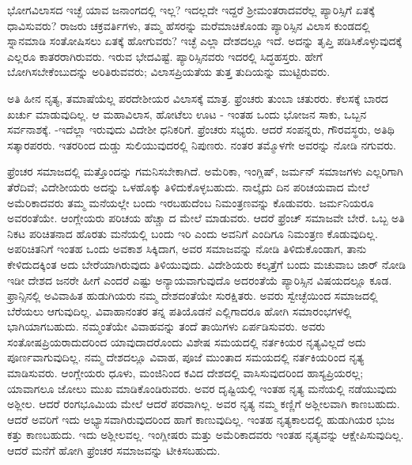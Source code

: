 ಭೋಗವಿಲಾಸದ ಇಚ್ಛೆ ಯಾವ ಜನಾಂಗದಲ್ಲಿ ಇಲ್ಲ? ಇದಲ್ಲದೇ ಇದ್ದರೆ ಶ‍್ರೀಮಂತ\break ರಾದವರೆಲ್ಲ ಪ್ಯಾರಿಸ್ಸಿಗೆ ಏತಕ್ಕೆ ಧಾವಿಸುವರು? ರಾಜರು ಚಕ್ರವರ್ತಿಗಳು, ತಮ್ಮ ಹೆಸರನ್ನು ಮರೆಮಾಚಿಕೊಂಡು ಪ್ಯಾರಿಸ್ಸಿನ ವಿಲಾಸ ಕುಂಡದಲ್ಲಿ ಸ್ನಾನಮಾಡಿ ಸಂತೋಷಿಸಲು ಏತಕ್ಕೆ ಹೋಗುವರು? ಇಚ್ಛೆ ಎಲ್ಲಾ ದೇಶದಲ್ಲೂ ಇದೆ. ಅದನ್ನು ತೃಪ್ತಿ ಪಡಿಸಿಕೊಳ್ಳುವುದಕ್ಕೆ ಎಲ್ಲರೂ ಕಾತರರಾಗಿರುವರು. ಇರುವ ಭೇದವಿಷ್ಟೆ. ಪ್ಯಾರಿಸ್ಸಿನವರು ಇದರಲ್ಲಿ ಸಿದ್ಧಹಸ್ತರು. ಹೇಗೆ ಬೋಗಿಸಬೇಕೆಂಬುದನ್ನು ಅರಿತಿರುವವರು; ವಿಲಾಸಪ್ರಿಯತೆಯ ತುತ್ತ ತುದಿಯನ್ನು ಮುಟ್ಟಿರುವರು.

ಅತಿ ಹೀನ ನೃತ್ಯ, ತಮಾಷೆಯೆಲ್ಲ ಪರದೇಶೀಯರ ವಿಲಾಸಕ್ಕೆ ಮಾತ್ರ. ಫ್ರೆಂಚರು ತುಂಬಾ ಚತುರರು. ಕೆಲಸಕ್ಕೆ ಬಾರದ ಖರ್ಚು ಮಾಡುವುದಿಲ್ಲ. ಆ ಮಹಾವಿಲಾಸ, ಹೋಟೆಲು ಊಟ - ಇಂತಹ ಒಂದು ಭೋಜನ ಸಾಕು, ಒಬ್ಬನ ಸರ್ವನಾಶಕ್ಕೆ. -ಇದೆಲ್ಲಾ ಇರುವುದು ವಿದೇಶೀ ಧನಿಕರಿಗೆ. ಫ್ರೆಂಚರು ಸಭ್ಯರು. ಆದರೆ ಸಂಪನ್ನರು, ಗೌರವಸ್ಥರು, ಅತಿಥಿ ಸತ್ಕಾರಪರರು. ಇತರರಿಂದ ದುಡ್ಡು ಸುಲಿಯುವುದರಲ್ಲಿ ನಿಪುಣರು. ನಂತರ ತಮ್ಮೊಳಗೇ ಅವರನ್ನು ನೋಡಿ ನಗುವರು.

\vskip 5pt

ಫ್ರೆಂಚರ ಸಮಾಜದಲ್ಲಿ ಮತ್ತೊಂದನ್ನು ಗಮನಿಸಬೇಕಾಗಿದೆ. ಅಮೆರಿಕಾ, ಇಂಗ್ಲಿಷ್​, ಜರ್ಮನ್​ ಸಮಾಜಗಳು ಎಲ್ಲರಿಗಾಗಿ ತೆರೆದಿವೆ; ವಿದೇಶೀಯರು ಅದನ್ನು ಒಳಹೊಕ್ಕು ತಿಳಿದುಕೊಳ್ಳಬಹುದು. ನಾಲ್ಕೈದು ದಿನ ಪರಿಚಯವಾದ ಮೇಲೆ ಅಮೆರಿಕಾದವರು ತಮ್ಮ ಮನೆಯಲ್ಲೇ ಬಂದು ಇರಬಹುದೆಂಬ ನಿಮಂತ್ರಣವನ್ನು ಕೊಡುವರು. ಜರ್ಮನಿಯರೂ ಅವರಂತೆಯೇ. ಆಂಗ್ಲೇಯರು ಪರಿಚಯ ಹೆಚ್ಚಾ ದ ಮೇಲೆ ಮಾಡುವರು. ಆದರೆ ಫ್ರೆಂಚ್​ ಸಮಾಜವೇ ಬೇರೆ. ಒಬ್ಬ ಅತಿ ನಿಕಟ ಪರಿಚಿತನಾದ ಹೊರತು ಮನೆಯಲ್ಲಿ ಬಂದು ಇರಿ ಎಂದು ಅವನಿಗೆ ಎಂದಿಗೂ ನಿಮಂತ್ರಣ ಕೊಡುವುದಿಲ್ಲ. ಅಪರಿಚಿತನಿಗೆ ಇಂತಹ ಒಂದು ಅವಕಾಶ ಸಿಕ್ಕಿದಾಗ, ಅವರ ಸಮಾಜವನ್ನು ನೋಡಿ ತಿಳಿದುಕೊಂಡಾಗ, ತಾನು ಕೇಳಿದುದಕ್ಕಿಂತ ಅದು ಬೇರೆಯಾಗಿರುವುದು ತಿಳಿಯುವುದು. ವಿದೇಶಿಯರು ಕಲ್ಕತ್ತೆಗೆ ಬಂದು ಮಚುವಾಬ ಜಾರ್​ ನೋಡಿ ಇಡೀ ದೇಶದ ಜನರೇ ಹೀಗೆ ಎಂದರೆ ಎಷ್ಟು ಅನ್ಯಾಯವಾಗುವುದೊ ಅದರಂತೆಯೆ ಪ್ಯಾರಿಸ್ಸಿನ ವಿಷಯದಲ್ಲೂ ಕೂಡ. ಫ್ರಾನ್ಸಿನಲ್ಲಿ ಅವಿವಾಹಿತ ಹುಡುಗಿಯರು ನಮ್ಮ ದೇಶದಂತೆಯೇ ಸುರಕ್ಷಿತರು. ಅವರು ಸ್ವೇಚ್ಛೆಯಿಂದ ಸಮಾಜದಲ್ಲಿ ಬೆರೆಯಲು ಆಗುವುದಿಲ್ಲ. ವಿವಾಹಾನಂತರ ತನ್ನ ಪತಿಯೊಡನೆ ಎಲ್ಲಿಗಾದರೂ ಹೋಗಿ ಸಮಾರಂಭಗಳಲ್ಲಿ ಭಾಗಿಯಾಗಬಹುದು. ನಮ್ಮಂತೆಯೇ ವಿವಾಹವನ್ನು ತಂದೆ ತಾಯಿಗಳು ಏರ್ಪಡಿಸುವರು. ಅವರು ಸಂತೋಷಪ್ರಿಯರಾದುದರಿಂದ ಯಾವುದಾದರೊಂದು ವಿಶೇಷ ಸಮಯದಲ್ಲಿ ನರ್ತಕಿಯರ ನೃತ್ಯವಿಲ್ಲದೆ ಅದು ಪೂರ್ಣವಾಗುವುದಿಲ್ಲ. ನಮ್ಮ ದೇಶದಲ್ಲೂ ವಿವಾಹ, ಪೂಜೆ ಮುಂತಾದ ಸಮಯದಲ್ಲಿ ನರ್ತಕಿಯರಿಂದ ನೃತ್ಯ ಮಾಡಿಸುವರು. ಆಂಗ್ಲೇಯರು ಧೂಳು, ಮಂಜಿನಿಂದ ಕವಿದ ದೇಶದಲ್ಲಿ ವಾಸಿಸುವುದರಿಂದ ಹಾಸ್ಯಪ್ರಿಯರಲ್ಲ; ಯಾವಾಗಲೂ ಜೋಲು ಮುಖ ಮಾಡಿಕೊಂಡಿರುವರು. ಅವರ ದೃಷ್ಟಿಯಲ್ಲಿ ಇಂತಹ ನೃತ್ಯ ಮನೆಯಲ್ಲಿ ನಡೆಯುವುದು ಅಶ್ಲೀಲ. ಆದರೆ ರಂಗಭೂಮಿಯ ಮೇಲೆ ಆದರೆ ಪರವಾಗಿಲ್ಲ. ಅವರ ನೃತ್ಯ ನಮ್ಮ ಕಣ್ಣಿಗೆ ಅಶ್ಲೀಲವಾಗಿ ಕಾಣಬಹುದು. ಆದರೆ ಅವರಿಗೆ ಇದು ಅಭ್ಯಾಸವಾಗಿರುವುದರಿಂದ ಹಾಗೆ ಕಾಣುವುದಿಲ್ಲ. ಇಂತಹ ನೃತ್ಯಕಾಲದಲ್ಲಿ ಹುಡುಗಿಯರ ಭುಜ ಕತ್ತು ಕಾಣಬಹುದು. ಇದು ಅಶ್ಲೀಲವಲ್ಲ. ಇಂಗ್ಲೀಷರು ಮತ್ತು ಅಮೆರಿಕಾದವರು ಇಂತಹ ನೃತ್ಯವನ್ನು ಆಕ್ಷೇಪಿಸುವುದಿಲ್ಲ. ಆದರೆ ಮನೆಗೆ ಹೋಗಿ ಫ್ರೆಂಚರ ಸಮಾಜವನ್ನು ಟೀಕಿಸಬಹುದು.

